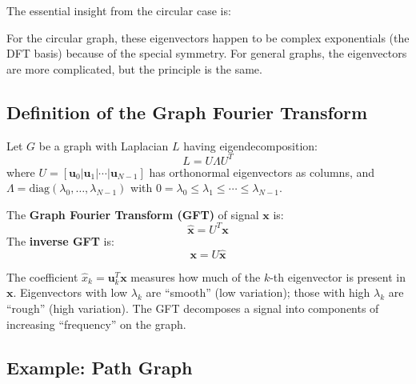 \begin{notechapter}
The essential insight from the circular case is:

\begin{center}
\end{center}

For the circular graph, these eigenvectors happen to be complex 
exponentials (the DFT basis) because of the special symmetry. For 
general graphs, the eigenvectors are more complicated, but the 
principle is the same.

\subsection{Definition of the Graph Fourier Transform}

\begin{definition}
Let $G$ be a graph with Laplacian $L$ having eigendecomposition:
\begin{equation}
L = U \Lambda U^T
\end{equation}
where $U = [\mathbf{u}_0 | \mathbf{u}_1 | \cdots | \mathbf{u}_{N-1}]$ 
has orthonormal eigenvectors as columns, and 
$\Lambda = \text{diag}(\lambda_0, \ldots, \lambda_{N-1})$ with 
$0 = \lambda_0 \leq \lambda_1 \leq \cdots \leq \lambda_{N-1}$.

The \textbf{Graph Fourier Transform (GFT)} of signal $\mathbf{x}$ is:
\begin{equation}
\hat{\mathbf{x}} = U^T \mathbf{x}
\end{equation}
The \textbf{inverse GFT} is:
\begin{equation}
\mathbf{x} = U \hat{\mathbf{x}}
\end{equation}
\end{definition}

\begin{remark}
The coefficient $\hat{x}_k = \mathbf{u}_k^T \mathbf{x}$ measures how 
much of the $k$-th eigenvector is present in $\mathbf{x}$. Eigenvectors 
with low $\lambda_k$ are ``smooth'' (low variation); those with high 
$\lambda_k$ are ``rough'' (high variation). The GFT decomposes a signal 
into components of increasing ``frequency'' on the graph.
\end{remark}

\subsection{Example: Path Graph}


\end{notechapter}
